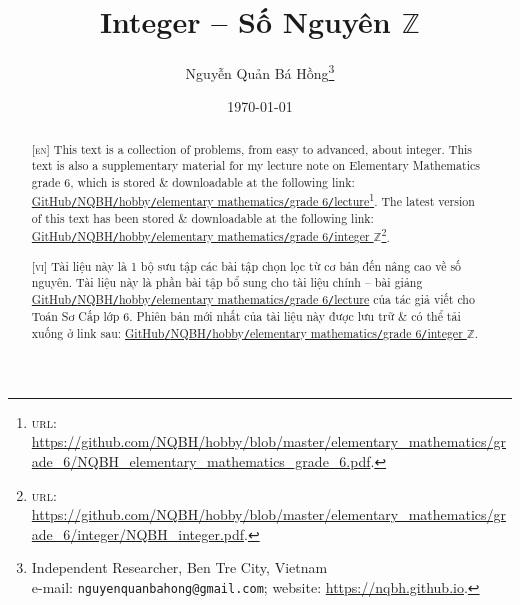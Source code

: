\documentclass{article}
\title{Integer -- Số Nguyên $\mathbb{Z}$}
\author{Nguyễn Quản Bá Hồng\footnote{Independent Researcher, Ben Tre City, Vietnam\\e-mail: \texttt{nguyenquanbahong@gmail.com}; website: \url{https://nqbh.github.io}.}}
\date{\today}
\numberwithin{equation}{section}
\begin{document}
\maketitle
\begin{abstract}
	\textsc{[en]} This text is a collection of problems, from easy to advanced, about integer. This text is also a supplementary material for my lecture note on Elementary Mathematics grade 6, which is stored \& downloadable at the following link: \href{https://github.com/NQBH/hobby/blob/master/elementary_mathematics/grade_6/NQBH_elementary_mathematics_grade_6.pdf}{GitHub\texttt{/}NQBH\texttt{/}hobby\texttt{/}elementary mathematics\texttt{/}grade 6\texttt{/}lecture}\footnote{\textsc{url}: \url{https://github.com/NQBH/hobby/blob/master/elementary_mathematics/grade_6/NQBH_elementary_mathematics_grade_6.pdf}.}. The latest version of this text has been stored \& downloadable at the following link: \href{https://github.com/NQBH/hobby/blob/master/elementary_mathematics/grade_6/integer/NQBH_integer.pdf}{GitHub\texttt{/}NQBH\texttt{/}hobby\texttt{/}elementary mathematics\texttt{/}grade 6\texttt{/}integer $\mathbb{Z}$}\footnote{\textsc{url}: \url{https://github.com/NQBH/hobby/blob/master/elementary_mathematics/grade_6/integer/NQBH_integer.pdf}.}.
	\vspace{2mm}
	
	\textsc{[vi]} Tài liệu này là 1 bộ sưu tập các bài tập chọn lọc từ cơ bản đến nâng cao về số nguyên. Tài liệu này là phần bài tập bổ sung cho tài liệu chính -- bài giảng \href{https://github.com/NQBH/hobby/blob/master/elementary_mathematics/grade_6/NQBH_elementary_mathematics_grade_6.pdf}{GitHub\texttt{/}NQBH\texttt{/}hobby\texttt{/}elementary mathematics\texttt{/}grade 6\texttt{/}lecture} của tác giả viết cho Toán Sơ Cấp lớp 6. Phiên bản mới nhất của tài liệu này được lưu trữ \& có thể tải xuống ở link sau: \href{https://github.com/NQBH/hobby/blob/master/elementary_mathematics/grade_6/integer/NQBH_integer.pdf}{GitHub\texttt{/}NQBH\texttt{/}hobby\texttt{/}elementary mathematics\texttt{/}grade 6\texttt{/}integer $\mathbb{Z}$}.
\end{abstract}
\tableofcontents
\newpage

\end{document}
